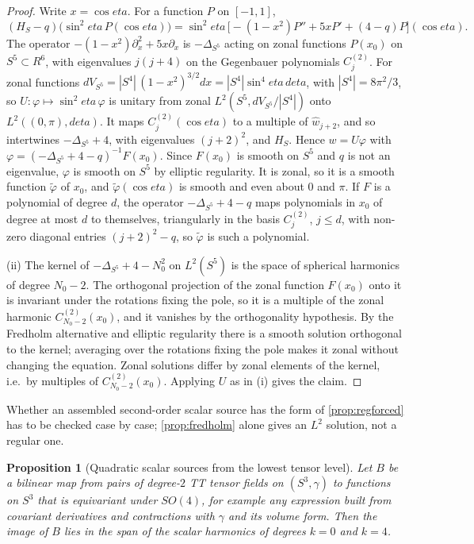 \documentclass[11pt]{article}
\theoremstyle{canonmath}
\theoremstyle{canonpostulate}
\theoremstyle{canonproposition}
\theoremstyle{canonmath}
\newtheorem{proposition*}[theorem]{Proposition}
\theoremstyle{canonproposition}
\providecommand{\R}{\mathbb{R}}
\def\mathbb#1{#1}%
\def\mathcal#1{#1}%
\def\eta{eta}%
\begin{document}
\begin{proof}
Write $x = \cos\eta$. For a function $P$ on $[-1,1]$,
\[
(\mathcal{H}_S - q)\bigl(\sin^2\eta\,P(\cos\eta)\bigr) = \sin^2\eta\,\bigl[-(1-x^2)P'' + 5xP' + (4-q)P\bigr](\cos\eta).
\]
The operator $-(1-x^2)\partial_x^2 + 5x\partial_x$ is $-\Delta_{S^5}$ acting on zonal functions $P(x_0)$ on $S^5\subset\R^6$, with eigenvalues $j(j+4)$ on the Gegenbauer polynomials $C^{(2)}_j$. For zonal functions $dV_{S^5} = |S^4|\,(1-x^2)^{3/2}dx = |S^4|\sin^4\eta\,d\eta$, with $|S^4| = 8\pi^2/3$, so $U:\varphi\mapsto\sin^2\eta\,\varphi$ is unitary from zonal $L^2(S^5, dV_{S^5}/|S^4|)$ onto $L^2((0,\pi),d\eta)$. It maps $C^{(2)}_j(\cos\eta)$ to a multiple of $\hat w_{j+2}$, and so intertwines $-\Delta_{S^5}+4$, with eigenvalues $(j+2)^2$, and $\mathcal{H}_S$. Hence $w = U\varphi$ with $\varphi = (-\Delta_{S^5}+4-q)^{-1}F(x_0)$. Since $F(x_0)$ is smooth on $S^5$ and $q$ is not an eigenvalue, $\varphi$ is smooth on $S^5$ by elliptic regularity. It is zonal, so it is a smooth function $\tilde\varphi$ of $x_0$, and $\tilde\varphi(\cos\eta)$ is smooth and even about $0$ and $\pi$. If $F$ is a polynomial of degree $d$, the operator $-\Delta_{S^5}+4-q$ maps polynomials in $x_0$ of degree at most $d$ to themselves, triangularly in the basis $C^{(2)}_j$, $j\le d$, with non-zero diagonal entries $(j+2)^2-q$, so $\tilde\varphi$ is such a polynomial.

(ii) The kernel of $-\Delta_{S^5}+4-N_0^2$ on $L^2(S^5)$ is the space of spherical harmonics of degree $N_0-2$. The orthogonal projection of the zonal function $F(x_0)$ onto it is invariant under the rotations fixing the pole, so it is a multiple of the zonal harmonic $C^{(2)}_{N_0-2}(x_0)$, and it vanishes by the orthogonality hypothesis. By the Fredholm alternative and elliptic regularity there is a smooth solution orthogonal to the kernel; averaging over the rotations fixing the pole makes it zonal without changing the equation. Zonal solutions differ by zonal elements of the kernel, i.e.\ by multiples of $C^{(2)}_{N_0-2}(x_0)$. Applying $U$ as in (i) gives the claim.
\end{proof}

Whether an assembled second-order scalar source has the form of \cref{prop:regforced} has to be checked case by case; \cref{prop:fredholm} alone gives an $L^2$ solution, not a regular one.

\begin{proposition*}[Quadratic scalar sources from the lowest tensor level]\label{prop:quadsel}
Let $B$ be a bilinear map from pairs of degree-$2$ TT tensor fields on $(S^3,\gamma)$ to functions on $S^3$ that is equivariant under $SO(4)$, for example any expression built from covariant derivatives and contractions with $\gamma$ and its volume form. Then the image of $B$ lies in the span of the scalar harmonics of degrees $k = 0$ and $k = 4$.
\end{proposition*}
\end{document}
